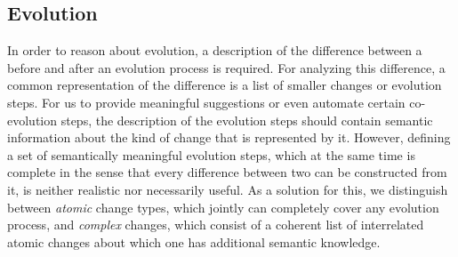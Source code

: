 \begin{comment}
The expected behavior of the model query operators in~\cref{fig:model-query-operators} is as follows.
The \texttt{select} operator selects \metamodel elements, which will appear in the view type, while the \texttt{filter} operator is used to define criteria by which model instances are included in a view when generating it.
\MA{So, if I understand correctly, a "select" is a "filter" with no filtering criterium?}
\LK{Not directly. Comparing it to databases, the "select" operator would create the column headers, i.e. specify what kind of data will be presented, while the "filter" operator would define (e.g., by defining a predicate function) which rows from the database will be included in the result. Is this understandable from what I wrote or do you have an idea how I could improve the explanation?}
For the multi-\metamodel case, the \texttt{join} operator connects model instances from different \metamodels.
Both, the \texttt{aggregate} and the \texttt{calculate} operator create new model elements.
While the former combines the values of a single property in multiple instances of a \metaclass, the latter is used to calculate a new property based on multiple existing ones.
Following \textcite{burger_model-join_2016}, we assume this is a reasonable set of operators for the definition of generic views.
\end{comment}

\subsection{\Metamodel Evolution}
\label{sec:MetaModelEvolution}

In order to reason about \metamodel evolution, a description of the difference between a \metamodel before and after an evolution process is required.
For analyzing this difference, a common representation of the difference is a list of smaller changes or evolution steps.
For us to provide meaningful suggestions or even automate certain co-evolution steps, the description of the evolution steps should contain semantic information about the kind of change that is represented by it.
However, defining a set of semantically meaningful evolution steps, which at the same time is complete in the sense that every difference between two \metamodels can be constructed from it, is neither realistic nor necessarily useful.
As a solution for this, we distinguish between \emph{atomic} \metamodel change types, which jointly can completely cover any evolution process, and \emph{complex} changes, which consist of a coherent list of interrelated atomic changes about which one has additional semantic knowledge.

